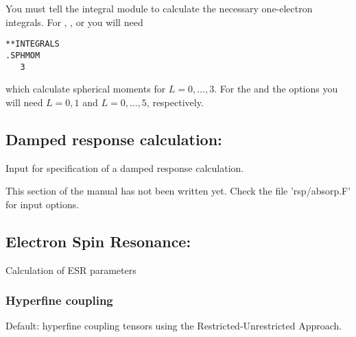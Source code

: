 
You must tell the integral module to calculate the necessary one-electron integrals.
For , , or  you will need

\begin{verbatim}
**INTEGRALS
.SPHMOM
   3
\end{verbatim}

which calculate spherical moments for $L = 0, \ldots, 3$.
For the  and the  options
you will need $L = 0, 1$ and $L = 0, \ldots, 5$, respectively.

\subsection{Damped response calculation: }
\label{sec:absorprsp}

Input for specification of a damped response calculation.

This section of the manual has not been written yet. Check the file 'rsp/absorp.F' for input options.

\subsection{Electron Spin Resonance: }

Calculation of ESR parameters

\subsubsection{Hyperfine coupling}

Default: hyperfine coupling tensors using
the Restricted-Unrestricted Approach.

